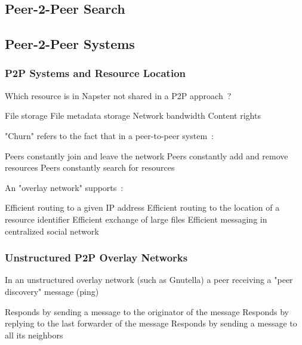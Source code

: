 \documentclass[12pt,a4paper,answers]{exam} %
\begin{document}
\begin{flushleft}
\begin{multicols*}{2}
\begin{questions}
\section{Peer-2-Peer Search}
\subsection{Peer-2-Peer Systems}
\subsubsection{P2P Systems and Resource Location}
\question Which resource is in Napster not shared in a P2P approach~?
\begin{checkboxes}
\choice File storage
\CorrectChoice File metadata storage
\choice Network bandwidth
\choice Content rights
\end{checkboxes}

\question "Churn" refers to the fact that in a peer-to-peer system~:
\begin{checkboxes}
\CorrectChoice Peers constantly join and leave the network
\choice Peers constantly add and remove resources
\choice Peers constantly search for resources
\end{checkboxes}

\question An "overlay network" supports~:
\begin{checkboxes}
\choice Efficient routing to a given IP address
\CorrectChoice Efficient routing to the location of a resource identifier
\choice Efficient exchange of large files
\choice Efficient messaging in centralized social network
\end{checkboxes}

\subsubsection{Unstructured P2P Overlay Networks}
\question In an unstructured overlay network (such as Gnutella) a peer receiving a "peer discovery" message (ping)
\begin{checkboxes}
\choice Responds by sending a message to the originator of the message
\CorrectChoice Responds by replying to the last forwarder of the message
\choice Responds by sending a message to all its neighbors
\end{checkboxes}


\end{questions}
\end{multicols*}
\end{flushleft}
\end{document}

